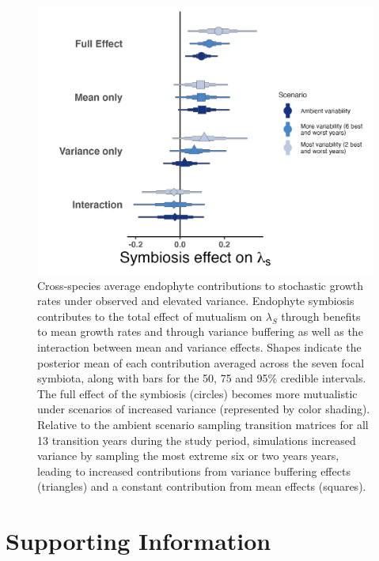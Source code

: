 \documentclass[lineno, sn-basic]{sn-jnl}%
\begin{document}
\begin{figure}
	\centering
	\includegraphics[width=.8\linewidth]{StochDemo_newFig5.png}
	\caption[Cross-species average endophyte contributions to stochastic growth rates under observed and elevated variance]{Cross-species average endophyte contributions to stochastic growth rates under observed and elevated variance. Endophyte symbiosis contributes to the total effect of mutualism on $\lambda_{S}$ through benefits to mean growth rates and through variance buffering as well as the interaction between mean and variance effects. Shapes indicate the posterior mean of each contribution averaged across the seven focal symbiota, along with bars for the 50, 75 and 95\% credible intervals.  The full effect of the symbiosis (circles) becomes more mutualistic under scenarios of increased variance (represented by color shading). Relative to the ambient scenario sampling transition matrices for all 13 transition years during the study period, simulations increased variance by sampling the most extreme six or two years years, leading to increased contributions from variance buffering effects (triangles) and a constant contribution from mean effects (squares).}
\end{figure}



\clearpage

\appendix


\setcounter{parttocdepth}{3}
\setcounter{secnumdepth}{-2}


\part{Supporting Information}


\parttoc
\renewcommand{\listmyfigurename}{List of Supp. Figures}
\renewcommand{\listtablename}{List of Supp. Tables}
\listofmyfigures
\listoftables
\end{document}
